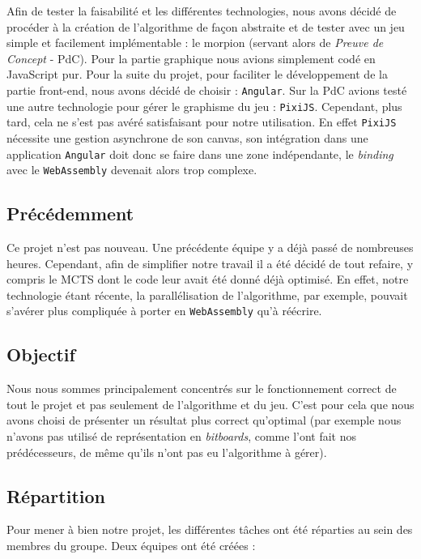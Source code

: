 \documentclass[a4paper,11pt]{article}
\begin{document}
Afin de tester la faisabilité et les différentes technologies, nous
avons décidé de procéder à la création de l'algorithme de façon
abstraite et de tester avec un jeu simple et facilement implémentable :
le morpion (servant alors de \emph{Preuve de Concept} - PdC). Pour la
partie graphique nous avions simplement codé en JavaScript pur. Pour la
suite du projet, pour faciliter le développement de la partie front-end,
nous avons décidé de choisir : \texttt{Angular}. Sur la PdC avions testé
une autre technologie pour gérer le graphisme du jeu : \texttt{PixiJS}.
Cependant, plus tard, cela ne s'est pas avéré satisfaisant pour notre
utilisation. En effet \texttt{PixiJS} nécessite une gestion asynchrone
de son canvas, son intégration dans une application \texttt{Angular}
doit donc se faire dans une zone indépendante, le \emph{binding} avec le
\texttt{WebAssembly} devenait alors trop complexe.

\subsection{Précédemment}\label{pruxe9cuxe9demment}

Ce projet n'est pas nouveau. Une précédente équipe y a déjà passé de
nombreuses heures. Cependant, afin de simplifier notre travail il a été
décidé de tout refaire, y compris le MCTS dont le code leur avait été
donné déjà optimisé. En effet, notre technologie étant récente, la
parallélisation de l'algorithme, par exemple, pouvait s'avérer plus
compliquée à porter en \texttt{WebAssembly} qu'à réécrire.

\subsection{Objectif}\label{objectif}

Nous nous sommes principalement concentrés sur le fonctionnement correct
de tout le projet et pas seulement de l'algorithme et du jeu. C'est pour
cela que nous avons choisi de présenter un résultat plus correct
qu'optimal (par exemple nous n'avons pas utilisé de représentation en
\emph{bitboards}, comme l'ont fait nos prédécesseurs, de même qu'ils
n'ont pas eu l'algorithme à gérer).

\subsection{Répartition}\label{ruxe9partition}

Pour mener à bien notre projet, les différentes tâches ont été réparties
au sein des membres du groupe. Deux équipes ont été créées :
\end{document}
